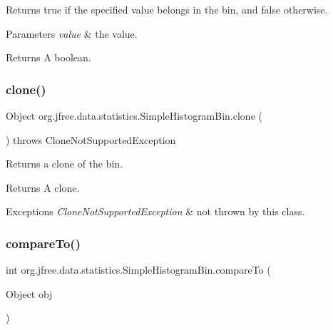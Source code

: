 Returns {\ttfamily true} if the specified value belongs in the bin, and {\ttfamily false} otherwise.


\begin{DoxyParams}{Parameters}
{\em value} & the value.\\
\hline
\end{DoxyParams}
\begin{DoxyReturn}{Returns}
A boolean. 
\end{DoxyReturn}
\mbox{\label{classorg_1_1jfree_1_1data_1_1statistics_1_1_simple_histogram_bin_a2f3219216624a143825a9e4a56631019}} 
\subsubsection{\texorpdfstring{clone()}{clone()}}
{\footnotesize\ttfamily Object org.\+jfree.\+data.\+statistics.\+Simple\+Histogram\+Bin.\+clone (\begin{DoxyParamCaption}{ }\end{DoxyParamCaption}) throws Clone\+Not\+Supported\+Exception}

Returns a clone of the bin.

\begin{DoxyReturn}{Returns}
A clone.
\end{DoxyReturn}

\begin{DoxyExceptions}{Exceptions}
{\em Clone\+Not\+Supported\+Exception} & not thrown by this class. \\
\hline
\end{DoxyExceptions}
\mbox{\label{classorg_1_1jfree_1_1data_1_1statistics_1_1_simple_histogram_bin_a58741825948ef732cc8ec35df1b52041}} 
\subsubsection{\texorpdfstring{compare\+To()}{compareTo()}}
{\footnotesize\ttfamily int org.\+jfree.\+data.\+statistics.\+Simple\+Histogram\+Bin.\+compare\+To (\begin{DoxyParamCaption}\item[{Object}]{obj }\end{DoxyParamCaption})}

